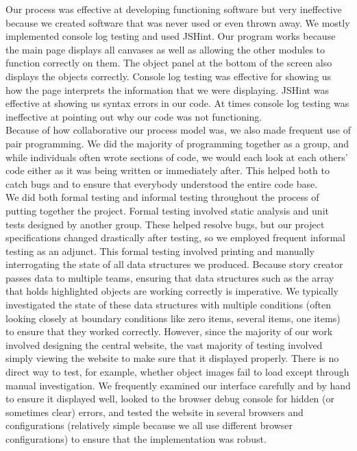 \documentclass[12pt]{article}
\begin{document}
Our process was effective at developing functioning software but very ineffective because we created software that was never used or even thrown away.  We mostly implemented console log testing and used JSHint.  Our program works because the main page displays all canvases as well as allowing the other modules to function correctly on them.  The object panel at the bottom of the screen also displays the objects correctly.  Console log testing was effective for showing us how the page interprets the information that we were displaying.  JSHint was effective at showing us syntax errors in our code.  At times console log testing was ineffective at pointing out why our code was not functioning.  \\

Because of how collaborative our process model was, we also made frequent use of pair programming. We did the majority of programming together as a group, and while individuals often wrote sections of code, we would each look at each others’ code either as it was being written or immediately after. This helped both to catch bugs and to ensure that everybody understood the entire code base. \\

We did both formal testing and informal testing throughout the process of putting together the project. Formal testing involved static analysis and unit tests designed by another group. These helped resolve bugs, but our project specifications changed drastically after testing, so we employed frequent informal testing as an adjunct. This formal testing involved printing and manually interrogating the state of all data structures we produced. Because story creator passes data to multiple teams, ensuring that data structures such as the array that holds highlighted objects are working correctly is imperative. We typically investigated the state of these data structures with multiple conditions (often looking closely at boundary conditions like zero items, several items, one items) to ensure that they worked correctly. However, since the majority of our work involved designing the central website, the vast majority of testing involved simply viewing the website to make sure that it displayed properly. There is no direct way to test, for example, whether object images fail to load except through manual investigation. We frequently examined our interface carefully and by hand to ensure it displayed well, looked to the browser debug console for hidden (or sometimes clear) errors, and tested the website in several browsers and configurations (relatively simple because we all use different browser configurations) to ensure that the implementation was robust. \\
\end{document}
